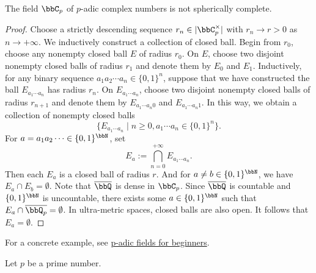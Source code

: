     \begin{proposition}\label{prop:C_p_is_not_spherically_complete}
        The field \(\bbC_p\) of \(p\)-adic complex numbers is not spherically complete.
    \end{proposition}
    \begin{proof}
        Choose a strictly descending sequence \(r_n \in |\bbC_p^\times|\) with \(r_n \to r > 0\) as \(n \to +\infty\).
        We inductively construct a collection of closed ball.
        Begin from \(r_0\), choose any nonempty closed ball \(E\) of radius \(r_0\).
        On \(E\), choose two disjoint nonempty closed balls of radius \(r_1\) and denote them by \(E_{0}\) and \(E_{1}\).
        Inductively, for any binary sequence \(a_1a_2\cdots a_n \in \{0,1\}^n\), suppose that we have constructed the ball \(E_{a_1\cdots a_n}\) has radius \(r_n\).
        On \(E_{a_1\cdots a_n}\), choose two disjoint nonempty closed balls of radius \(r_{n+1}\) and denote them by \(E_{a_1\cdots a_n 0}\) and \(E_{a_1\cdots a_n 1}\).
        In this way, we obtain a collection of nonempty closed balls 
        \[ \{E_{a_1\cdots a_n} \mid n \geq 0, a_1\cdots a_n \in \{0,1\}^n\}. \]
        For \(a = a_1 a_2 \cdots \in \{0,1\}^\bbN\), set
        \[ E_a := \bigcap_{n=0}^{+\infty} E_{a_1\cdots a_n}. \]
        Then each \(E_a\) is a closed ball of radius \(r\).
        And for \(a \neq b \in \{0,1\}^\bbN\), we have \(E_a \cap E_b = \emptyset\).
        Note that \(\overline{\bbQ}\) is dense in \(\bbC_p\).
        Since \(\overline{\bbQ}\) is countable and \(\{0,1\}^\bbN\) is uncountable, there exists some \(a \in \{0,1\}^\bbN\) such that \(E_a \cap \overline{\bbQ_p} = \emptyset\).
        In ultra-metric spaces, closed balls are also open.
        It follows that \(E_a = \emptyset\).
    \end{proof}

    \begin{remark}\label{rmk:certain_example_of_C_p_is_not_spherically_complete}
        For a concrete example, see \href{https://sbseminar.wordpress.com/2007/08/21/p-adic-fields-for-beginners/}{p-adic fields for beginners}.
    \end{remark}

    \begin{construction}\label{constr:spherically_complete_p-adic_fields}
        Let \(p\) be a prime number.
    \end{construction}

